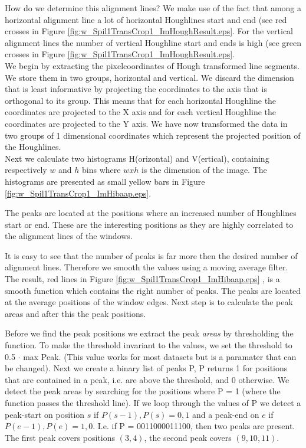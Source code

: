 How do we determine this alignment lines? We make use of the fact that among a
horizontal alignment line a lot of horizontal Houghlines start and end (see red
crosses in Figure \ref{fig:w_Spil1TransCrop1_ImHoughResult.eps}. For the vertical alignment lines
the number of vertical Houghline start and ends is high (see green crosses in
Figure \ref{fig:w_Spil1TransCrop1_ImHoughResult.eps}.\\

We begin by extracting the pixelcoordinates of Hough transformed line
segments. We store them in two groups, horizontal and vertical.%
We discard the dimension that is least informative by projecting the coordinates to
the axis that is orthogonal to its group. 
This means that for each horizontal Houghline the coordinates are projected to the X
axis and for each vertical Houghline the coordinates are projected to the Y
axis. We have now transformed the data in two groups of 1 dimensional
coordinates which represent the projected position of the Houghlines.\\

Next we calculate two histograms H(orizontal) and V(ertical), containing respectively
$w$ and $h$ bins where $w x h$ is the dimension of the image.  The histograms
are presented as small yellow bars in Figure \ref{fig:w_Spil1TransCrop1_ImHibaap.eps}.

The peaks are located at the positions where an increased number of Houghlines
start or end.  These are the interesting positions as they are highly correlated
to the alignment lines of the windows. 

It is easy to see that the number of peaks is far more then the desired number of alignment lines.
Therefore we smooth the values using a moving average filter.
The result, red lines in Figure \ref{fig:w_Spil1TransCrop1_ImHibaap.eps}
, is a smooth function which contains the right number of peaks. The peaks
are located at the average positions of the window edges. Next step is to
calculate the peak areas and after this the peak positions. 

Before we find the peak positions we extract the peak \emph{areas} by thresholding the
function. To make the threshold invariant to the values, we set the threshold to 0.5 $\cdot$ max Peak. 
(This value works for most datasets but is a paramater that can be changed).
Next we create a binary list of peaks P, P returns 1 for positions that are contained in
a peak, i.e. are above the threshold, and 0 otherwise.
We detect the peak areas by searching for the positions where P = 1
(where the function passes the threshold line). 
If we loop through the values of P we detect a peak-start on position $s$ if ${P(s-1),P(s)}={0,1}$
and a peak-end on $e$ if ${P(e-1),P(e)}={1,0}$. 
I.e. if P = 0011000011100, then two peaks are present. The first peak covers positions $(3,4)$, 
the second peak covers $(9,10,11)$.\\

